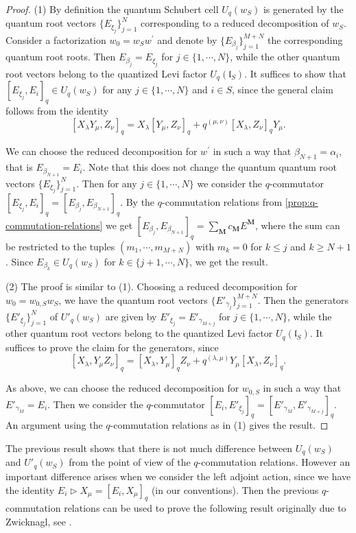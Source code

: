 \documentclass[a4paper, 12pt, reqno, english]{amsart}
\numberwithin{equation}{section}
\numberwithin{figure}{section}
\theoremstyle{plain}
\theoremstyle{plain}
\theoremstyle{plain}
\theoremstyle{plain}
\theoremstyle{plain}
\theoremstyle{definition}
\theoremstyle{definition}
\theoremstyle{definition}
\theoremstyle{remark}
\theoremstyle{definition}
\theoremstyle{definition}
\newcommand{\UqlS}{U_q(\mathfrak{l}_S)}
\newcommand{\schub}{U_q}
\newcommand{\tschub}{U'_q}
\newcommand{\bfM}{\mathbf{M}}
\begin{document}
\begin{proof}
(1) By definition the quantum Schubert cell $\schub(w_S)$ is generated by the quantum root vectors $\{ E_{\xi_j} \}_{j = 1}^N$ corresponding to a reduced decomposition of $w_S$.
Consider a factorization $w_0 = w_S w^\prime$ and denote by $\{ E_{\beta_j} \}_{j = 1}^{M + N}$ the corresponding quantum root roots. Then $E_{\beta_j} = E_{\xi_j}$ for $j \in \{ 1, \cdots, N \}$, while the other quantum root vectors belong to the quantized Levi factor $\UqlS$.
It suffices to show that $[E_{\xi_j}, E_i]_q \in \schub(w_S)$ for any $j \in \{ 1, \cdots, N \}$ and $i \in S$, since the general claim follows from the identity
\[
[X_\lambda Y_\mu, Z_\nu]_q = X_\lambda [Y_\mu, Z_\nu]_q + q^{(\mu, \nu)} [X_\lambda, Z_\nu]_q Y_\mu.
\]

We can choose the reduced decomposition for $w^\prime$ in such a way that $\beta_{N + 1} = \alpha_i$, that is $E_{\beta_{N + 1}} = E_i$.
Note that this does not change the quantum quantum root vectors $\{ E_{\xi_j} \}_{j = 1}^N$.
Then for any $j \in \{ 1, \cdots, N \}$ we consider the $q$-commutator $[E_{\xi_j}, E_i]_q = [E_{\beta_j}, E_{\beta_{N + 1}}]_q$.
By the $q$-commutation relations from \cref{prop:q-commutation-relations} we get $[E_{\beta_j}, E_{\beta_{N + 1}}]_q = \sum_\bfM c_\bfM E^\bfM$, where the sum can be restricted to the tuples $(m_1, \cdots, m_{M + N})$ with $m_k = 0$ for $k \leq j$ and $k \geq N + 1$.
Since $E_{\beta_k} \in \schub(w_S)$ for $k \in \{ j + 1, \cdots, N \}$, we get the result.

(2) The proof is similar to (1). Choosing a reduced decomposition for $w_0 = w_{0, S} w_S$, we have the quantum root vectors $\{ E'_{\gamma_j} \}_{j = 1}^{M + N}$.
Then the generators $\{ E'_{\xi_j} \}_{j = 1}^N$ of $\tschub(w_S)$ are given by $E'_{\xi_j} = E'_{\gamma_{M + j}}$ for $j \in \{ 1, \cdots, N \}$, while the other quantum root vectors belong to the quantized Levi factor $\UqlS$.
It suffices to prove the claim for the generators, since
\[
[X_\lambda, Y_\mu Z_\nu]_q = [X_\lambda, Y_\mu]_q Z_\nu + q^{(\lambda, \mu)} Y_\mu [X_\lambda, Z_\nu]_q.
\]

As above, we can choose the reduced decomposition for $w_{0, S}$ in such a way that $E'_{\gamma_M} = E_i$.
Then we consider the $q$-commutator $[E_i, E'_{\xi_j}]_q = [E'_{\gamma_M}, E'_{\gamma_{M + j}}]_q$.
An argument using the $q$-commutation relations as in (1) gives the result.
\end{proof}

The previous result shows that there is not much difference between $\schub(w_S)$ and $\tschub(w_S)$ from the point of view of the $q$-commutation relations.
However an important difference arises when we consider the left adjoint action, since we have the identity $E_i \triangleright X_\mu = [E_i, X_\mu]_q$ (in our conventions).
Then the previous $q$-commutation relations can be used to prove the following result originally due to Zwicknagl, see \cite[Theorem 5.21(b)]{zwicknagl}.
\end{document}
